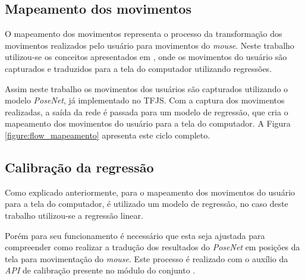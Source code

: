 

\subsection{Mapeamento dos movimentos}

\par O mapeamento dos movimentos representa o processo da transformação dos movimentos realizados pelo usuário para movimentos do \textit{mouse}. Neste trabalho utilizou-se os conceitos apresentados em \cite{Papoutsaki2016}, onde os movimentos do usuário são capturados e traduzidos para a tela do computador utilizando regressões.

\par Assim neste trabalho os movimentos dos usuários são capturados utilizando o modelo \textit{PoseNet}, já implementado no TFJS. Com a captura dos movimentos realizadas, a saída da rede é passada para um modelo de regressão, que cria o mapeamento dos movimentos do usuário para a tela do computador. A Figura \ref{figure:flow_mapeamento} apresenta este ciclo completo.


\subsection{Calibração da regressão}

\par Como explicado anteriormente, para o mapeamento dos movimentos do usuário para a tela do computador, é utilizado um modelo de regressão, no caso deste trabalho utilizou-se a regressão linear. 

\par Porém para seu funcionamento é necessário que esta seja ajustada para compreender como realizar a tradução dos resultados do \textit{PoseNet} em posições da tela para movimentação do \textit{mouse}. Este processo é realizado com o auxílio da \textit{API} de calibração presente no módulo  do conjunto .

